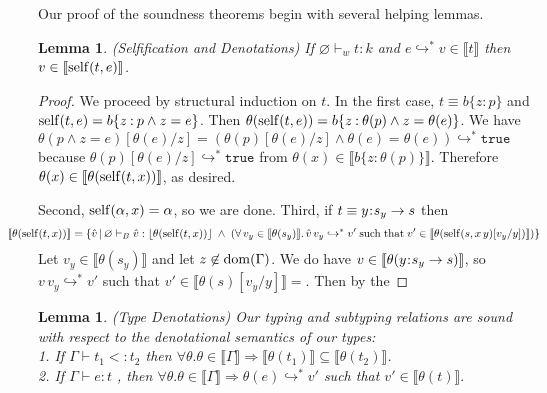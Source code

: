 \documentclass[11pt]{article}
\newtheorem{lemma}[theorem]{Lemma}
\newcommand{\al}{\alpha}
\newcommand{\bind}{\hspace{0.05em}{:}\hspace{0.05em}} %
\newcommand{\col}{\mathbin{:}}       %
\newcommand{\lb}{\llbracket}         %
\newcommand{\rb}{\rrbracket}         %
\newcommand{\many}{\hookrightarrow^*}
\newcommand{\true}{\mathtt{true}}
\newcommand{\functype}[3]{#1\bind #2 \rightarrow #3}
\newcommand{\dom}[1]{{\rm dom}(#1)}
\begin{document}
Our proof of the soundness theorems begin with several helping lemmas.

\begin{lemma}{(Selfification and Denotations) If $\varnothing \vdash_w t : k$ and %
$e\many v \in \lb t\rb$ then $v \in \lb {\rm self}(t,e)\rb$.} \label{self-denote}
\end{lemma}
\begin{proof} %
We proceed by structural induction on $t$. In the first case, $t \equiv b\{z\col p\}$ and ${\rm self}(t, e) = b\{z \col p \wedge z = e\}$. Then $\theta({\rm self}(t, e)) = b\{z\col \theta(p) \wedge z = \theta(e)\}$. 
We have $\theta(p\wedge z = e)[\theta(e)/z] = (\theta(p)[\theta(e)/z] \wedge \theta(e)=\theta(e)) \many \true$
because $\theta(p)[\theta(e)/z] \many \true$ from $\theta(x)\in\lb b\{z\col \theta(p)\}\rb.$ Therefore $\theta(x) \in \lb\theta({\rm self}(t,x))\rb$, as desired.

Second, ${\rm self}(\al, x) = \al$, so we are done. Third, if $t \equiv \functype{y}{s_y}{s}$ then 
\[ \hspace*{-1cm}
\lb\theta({\rm self}(t,x))\rb = \{\hat v \,|\, \varnothing \vdash_B \hat v : \lfloor \theta({\rm self}(t,x)) \rfloor \;\wedge\; (\forall\, v_y \in \lb \theta(s_y) \rb.\, \hat v\, v_y \many v' \;{\rm such\; that}\; v'\in \lb \theta({\rm self}(s,x\, y)[v_y/y]) \rb ) \}
\]
Let $v_y \in \lb\theta(s_y)\rb$ and let $z\not\in\dom\Gamma$.
We do have $v \in \lb\theta(\functype{y}{s_y}{s})\rb$, so $v\, v_y \many v'$ such that $v' \in \lb\theta(s)[v_y/y]\rb = $. 
Then by the 


\end{proof}

\begin{lemma}{(Type Denotations) Our typing and subtyping relations are sound with respect to the denotational semantics of our types:\\
1. If $\Gamma \vdash t_1 <: t_2$ then $\forall \theta. \theta \in \lb \Gamma \rb \Rightarrow \lb\theta(t_1)\rb \subseteq \lb\theta(t_2)\rb$.\\
2. If $\Gamma \vdash e : t$ %
, then $\forall \theta. \theta \in \lb \Gamma \rb \Rightarrow \theta(e) \many v'$ such that $v' \in \lb\theta(t)\rb.$
}\label{type-denote}
\end{lemma}
\end{document}
